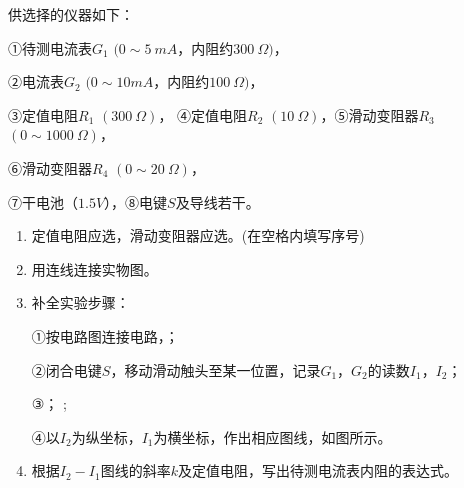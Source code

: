 \begin{enumerate}[leftmargin=0em]
供选择的仪器如下：

①待测电流表$ G_{1} $ $ (0 \sim 5 \ mA $，内阻约$ 300 \ \Omega ) $，

②电流表$ G_{2} $ $ (0 \sim 10 mA $，内阻约$ 100 \ \Omega ) $，

③定值电阻$ R_{1} $ $ (300 \ \Omega ) $， ④定值电阻$ R_{2} $ $ (10 \ \Omega ) $，⑤滑动变阻器$ R_{3} $ $ (0 \sim 1000 \ \Omega ) $， 
 
⑥滑动变阻器$ R_{4} $ $ (0 \sim 20 \ \Omega ) $，

⑦干电池（$ 1.5V $），⑧电键$ S $及导线若干。

\begin{enumerate}
\renewcommand{\labelenumi}{\arabic{enumi}.}
\item
定值电阻应选，滑动变阻器应选。(在空格内填写序号)
\item 
用连线连接实物图。
\item 
补全实验步骤：

①按电路图连接电路，；

②闭合电键$ S $，移动滑动触头至某一位置，记录$ G_{1} $，$ G_{2} $的读数$ I_{1} $，$ I_{2} $；

③； ;

④以$ I_{2} $为纵坐标，$ I_{1} $为横坐标，作出相应图线，如图所示。
\begin{figure}[h!]
\centering

\end{figure}

\item 
根据$ I_2-I_1 $图线的斜率$ k $及定值电阻，写出待测电流表内阻的表达式。

\end{enumerate}









\end{enumerate}

